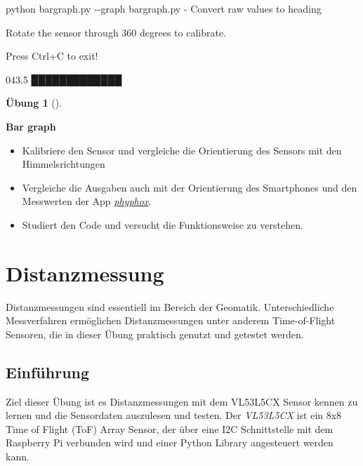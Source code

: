 \documentclass[
  11pt,
  a4paperpaper,
  oneside, openany  ,captions=tableheading
]{scrbook}
\newenvironment{Shaded}{\begin{snugshade}}{\end{snugshade}}
\newcommand{\AttributeTok}[1]{\textcolor[rgb]{0.40,0.45,0.13}{#1}}
\newcommand{\ExtensionTok}[1]{\textcolor[rgb]{0.00,0.23,0.31}{#1}}
\newcommand{\NormalTok}[1]{\textcolor[rgb]{0.00,0.23,0.31}{#1}}
\providecommand{\tightlist}{%
  \setlength{\itemsep}{0pt}\setlength{\parskip}{0pt}}
\theoremstyle{definition}
\newtheorem{exercise}{Übung}[chapter]
\theoremstyle{remark}
\begin{document}
\begin{Shaded}
\begin{Highlighting}[]
\ExtensionTok{python}\NormalTok{ bargraph.py }\AttributeTok{{-}{-}graph}
\ExtensionTok{bargraph.py} \AttributeTok{{-}}\NormalTok{ Convert raw values to heading}

\ExtensionTok{Rotate}\NormalTok{ the sensor through 360 degrees to calibrate.}

\ExtensionTok{Press}\NormalTok{ Ctrl+C to exit!}

\ExtensionTok{043.5}\NormalTok{ █████████████                                                                                                     }
\end{Highlighting}
\end{Shaded}

\begin{exercise}[]\protect\hypertarget{exr-bewegungsmessung-heading}{}\label{exr-bewegungsmessung-heading}

\textbf{Bar graph}

\begin{itemize}
\tightlist
\item
  Kalibriere den Sensor und vergleiche die Orientierung des Sensors mit
  den Himmelsrichtungen
\item
  Vergleiche die Ausgaben auch mit der Orientierung des Smartphones und
  den Messwerten der App \emph{\href{https://phyphox.org}{phyphox}}.
\item
  Studiert den Code und versucht die Funktionsweise zu verstehen.
\end{itemize}

\end{exercise}

\chapter{Distanzmessung}\label{distanzmessung}

Distanzmessungen sind essentiell im Bereich der Geomatik.
Unterschiedliche Messverfahren ermöglichen Distanzmessungen unter
anderem Time-of-Flight Sensoren, die in dieser Übung praktisch genutzt
und getestet werden.

\hfill\break

\section{Einführung}\label{einfuxfchrung-3}

Ziel dieser Übung ist es Distanzmessungen mit dem VL53L5CX Sensor kennen
zu lernen und die Sensordaten auszulesen und testen. Der \emph{VL53L5CX}
ist ein 8x8 Time of Flight (ToF) Array Sensor, der über eine I2C
Schnittstelle mit dem Raspberry Pi verbunden wird und einer Python
Library angesteuert werden kann.
\end{document}

